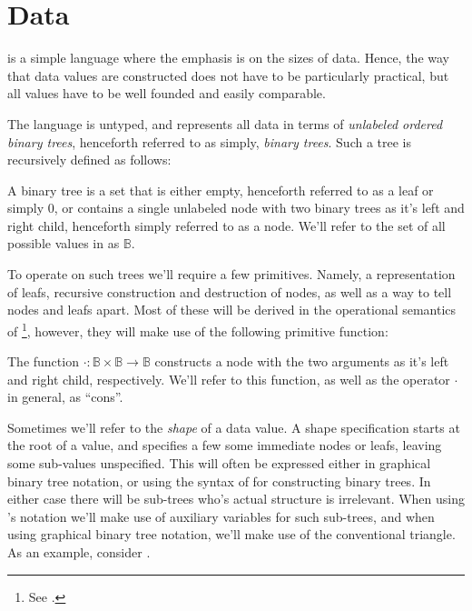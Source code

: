 \section{Data}

\D{} is a simple language where the emphasis is on the sizes of data. Hence,
the way that data values are constructed does not have to be particularly
practical, but all values have to be well founded and easily comparable.

The language \D{} is untyped, and represents all data in terms of
\emph{unlabeled ordered binary trees}, henceforth referred to as simply,
\emph{binary trees}. Such a tree is recursively defined as follows:

\begin{definition}

A binary tree is a set that is either empty, henceforth referred to as a leaf
or simply $0$, or contains a single unlabeled node with two binary trees as
it's left and right child, henceforth simply referred to as a node. We'll refer
to the set of all possible values in \D{} as $\mathbb{B}$.

\end{definition}

To operate on such trees we'll require a few primitives. Namely, a
representation of leafs, recursive construction and destruction of nodes, as
well as a way to tell nodes and leafs apart. Most of these will be derived in
the operational semantics of \D{}\footnote{See .},
however, they will make use of the following primitive function:

\begin{definition}

The function $\cdot :\mathbb{B}\times\mathbb{B}\rightarrow\mathbb{B}$
constructs a node with the two arguments as it's left and right child,
respectively. We'll refer to this function, as well as the operator $\cdot$ in
general, as ``cons''. 

\end{definition}

Sometimes we'll refer to the \emph{shape} of a data value. A shape
specification starts at the root of a value, and specifies a few some immediate
nodes or leafs, leaving some sub-values unspecified. This will often be expressed
either in graphical binary tree notation, or using the syntax of \D{} for
constructing binary trees. In either case there will be sub-trees who's actual
structure is irrelevant. When using \D{}'s notation we'll make use of auxiliary
variables for such sub-trees, and when using graphical binary tree notation,
we'll make use of the conventional triangle. As an example, consider
.

 
